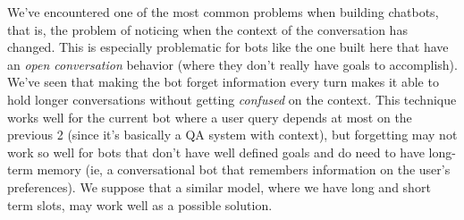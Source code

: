 \documentclass[11pt,a4paper]{article}
\begin{document}
	We've encountered one of the most common problems when building chatbots, that is, the problem of noticing when the context of the conversation has changed. This is especially problematic for bots like the one built here that have an \textit{open conversation} behavior (where they don't really have goals to accomplish). We've seen that making the bot forget information every turn makes it able to hold longer conversations without getting \textit{confused} on the context. This technique works well for the current bot where a user query depends at most on the previous 2 (since it's basically a QA system with context), but forgetting may not work so well for bots that don't have well defined goals and do need to have long-term memory (ie, a conversational bot that remembers information on the user's preferences). We suppose that a similar model, where we have long and short term slots, may work well as a possible solution. 
	



%

%


%
\end{document}
